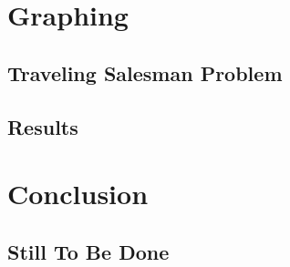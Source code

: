 \documentclass[12pt]{report}
\begin{document}
\chapter{Graphing}
\section{Traveling Salesman Problem}

\section{Results}

\chapter{Conclusion}
\section{Still To Be Done}

{}
\end{document}
